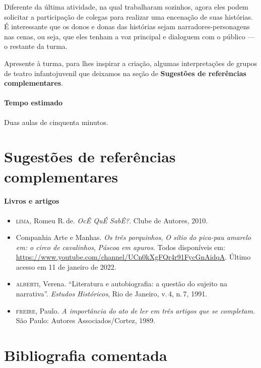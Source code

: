 \documentclass[11pt]{extarticle}
\begin{document}
Diferente da última atividade, na qual trabalharam sozinhos, agora eles podem 
solicitar a participação de colegas para realizar uma encenação de suas histórias. 
É interessante que os donos e donas das histórias sejam narradores-personagens 
nas cenas, ou seja, que eles tenham a voz principal e dialoguem com o público --- o restante da turma. 

Apresente à turma, para lhes inspirar a criação, algumas interpretações
de grupos de teatro infantojuvenil que deixamos na seção de \textbf{Sugestões de referências complementares}.


\paragraph{Tempo estimado} Duas aulas de cinquenta minutos.

\section{Sugestões de referências complementares}

\paragraph{Livros e artigos}

\begin{itemize}
	
\item \textsc{lima}, Romeu R.\,de. \textit{OcÊ QuÉ SabÊ?}. Clube de Autores, 2010. 

\item Companhia Arte e Manhas. \textit{Os três porquinhos}, \textit{O sítio do pica-pau amarelo em: o circo de cavalinhos},
\textit{Páscoa em apuros}. Todos disponíveis em: \url{https://www.youtube.com/channel/UCn0kXgFQr4r91FycGnAidqA}. Último acesso em 11 de janeiro de 2022.

\item \textsc{alberti}, Verena. ``Literatura e autobiografia: a questão do sujeito na narrativa''. \textit{Estudos Históricos}, Rio de Janeiro, v.\,4, n.\,7, 1991.

\item \textsc{freire}, Paulo. \textit{A importância do ato de ler em três artigos que se completam}. São Paulo: Autores Associados/Cortez, 1989.

\end{itemize}

\section{Bibliografia comentada}
\end{document}
